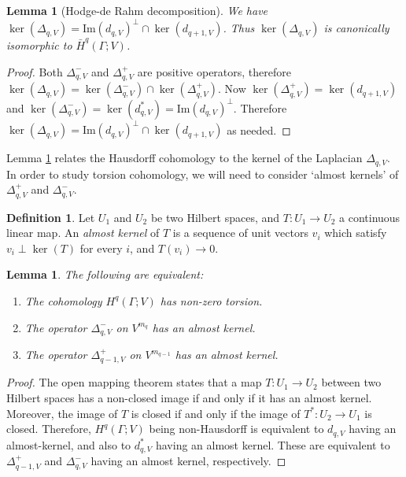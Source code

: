 \documentclass[12pt,reqno]{amsart}
\newtheorem{lemma}[theorem]{Lemma}
\theoremstyle{definition}
\newtheorem{definition}[theorem]{Definition}
\begin{document}
\begin{lemma}[Hodge-de Rahm decomposition] \label{lemma:Hodge-de Rahm}
We have $\ker(\Delta_{q,V}) = \mathrm{Im}(d_{q,V})^{\perp} \cap \ker(d_{q+1,V})$. Thus $\ker(\Delta_{q,V})$ is canonically isomorphic to $\bar{H}^q(\Gamma;V)$.
\end{lemma}
\begin{proof}
    Both $\Delta_{q,V}^-$ and $\Delta_{q,V}^+$ are positive operators, therefore $\ker(\Delta_{q,V}) = \ker(\Delta_{q,V}^-) \cap \ker(\Delta_{q,V}^+)$. Now $\ker(\Delta_{q,V}^+) = \ker(d_{q+1,V})$ and  $\ker(\Delta_{q,V}^-) = \ker(d_{q,V}^*) = \mathrm{Im}(d_{q,V})^{\perp}$. Therefore $\ker(\Delta_{q,V}) = \mathrm{Im}(d_{q,V})^{\perp} \cap \ker(d_{q+1,V})$ as needed.
\end{proof}
Lemma \ref{lemma:Hodge-de Rahm} relates the Hausdorff cohomology to the kernel of the Laplacian $\Delta_{q,V}$. In order to study torsion cohomology, we will need to consider `almost kernels' of $\Delta_{q,V}^+$ and $\Delta_{q,V}^-$.
\begin{definition}
    Let $U_1$ and $U_2$ be two Hilbert spaces, and $T\colon U_1 \rightarrow U_2$ a continuous linear map. An \emph{almost kernel} of $T$ is a sequence of unit vectors $v_i$ which satisfy $v_i \perp \ker(T)$ for every $i$, and $T(v_i) \rightarrow 0$.
\end{definition}
\begin{lemma}\label{lemma:non-Hausdorff characterization}
    The following are equivalent:
    \begin{enumerate}
        \item The cohomology $H^q(\Gamma;V)$ has non-zero torsion.
        \item The operator $\Delta_{q,V}^-$ on $V^{m_q}$ has an almost kernel.
        \item The operator $\Delta_{q-1,V}^+$ on $V^{m_{q-1}}$ has an almost kernel.
    \end{enumerate}
\end{lemma}
\begin{proof}
    The open mapping theorem states that a map $T\colon U_1 \rightarrow U_2$ between two Hilbert spaces has a non-closed image if and only if it has an almost kernel. Moreover, the image of $T$ is closed if and only if the image of $T^*\colon U_2 \rightarrow U_1$ is closed. Therefore, $H^q(\Gamma;V)$ being non-Hausdorff is equivalent to $d_{q,V}$ having an almost-kernel, and also to $d_{q,V}^*$ having an almost kernel. These are equivalent to $\Delta_{q-1,V}^+$ and $\Delta_{q,V}^-$ having an almost kernel, respectively. 
\end{proof}
\end{document}
